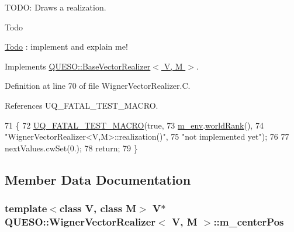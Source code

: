 T\-O\-D\-O\-: Draws a realization. 

\begin{DoxyRefDesc}{Todo}
\item[\hyperlink{todo__todo000056}{Todo}]\-: implement and explain me! \end{DoxyRefDesc}


Implements \hyperlink{class_q_u_e_s_o_1_1_base_vector_realizer_a6845173dd79a80ae11c86cde26e55817}{Q\-U\-E\-S\-O\-::\-Base\-Vector\-Realizer$<$ V, M $>$}.



Definition at line 70 of file Wigner\-Vector\-Realizer.\-C.



References U\-Q\-\_\-\-F\-A\-T\-A\-L\-\_\-\-T\-E\-S\-T\-\_\-\-M\-A\-C\-R\-O.


\begin{DoxyCode}
71 \{
72   \hyperlink{_defines_8h_a56d63d18d0a6d45757de47fcc06f574d}{UQ\_FATAL\_TEST\_MACRO}(\textcolor{keyword}{true},
73                       \hyperlink{class_q_u_e_s_o_1_1_base_vector_realizer_acde246c52f82d8ed687d91cfac14c29c}{m\_env}.\hyperlink{class_q_u_e_s_o_1_1_base_environment_a78b57112bbd0e6dd0e8afec00b40ffa7}{worldRank}(),
74                       \textcolor{stringliteral}{"WignerVectorRealizer<V,M>::realization()"},
75                       \textcolor{stringliteral}{"not implemented yet"});
76   
77   nextValues.cwSet(0.);
78   \textcolor{keywordflow}{return};
79 \}
\end{DoxyCode}


\subsection{Member Data Documentation}
\hypertarget{class_q_u_e_s_o_1_1_wigner_vector_realizer_afe5a5ae0e04ca222b2d1c9b84a297896}{
\subsubsection[{m\-\_\-center\-Pos}]{\setlength{\rightskip}{0pt plus 5cm}template$<$class V, class M$>$ V$\ast$ {\bf Q\-U\-E\-S\-O\-::\-Wigner\-Vector\-Realizer}$<$ V, M $>$\-::m\-\_\-center\-Pos\hspace{0.3cm}{\ttfamily [private]}}}\label{class_q_u_e_s_o_1_1_wigner_vector_realizer_afe5a5ae0e04ca222b2d1c9b84a297896}


